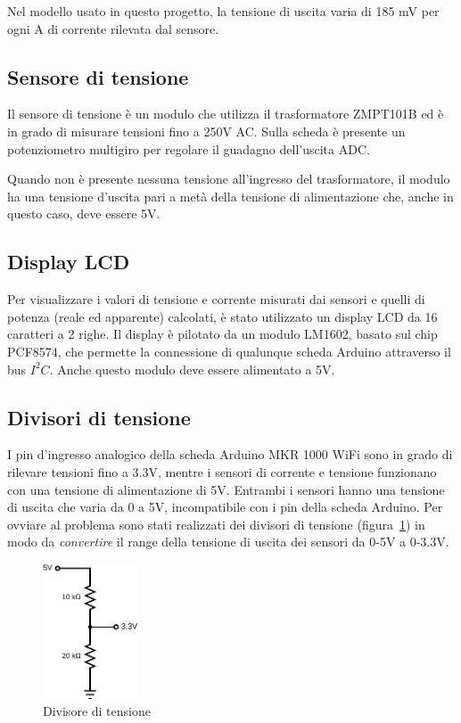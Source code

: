 \documentclass[italian,12pt,a4paper,oneside,final]{report}
\begin{document}
Nel modello usato in questo progetto, la tensione di uscita varia di 185 mV per ogni A di corrente rilevata dal sensore.

\subsection{Sensore di tensione}
Il sensore di tensione è un modulo che utilizza il trasformatore ZMPT101B ed è in grado di misurare tensioni fino a 250V AC.
Sulla scheda è presente un potenziometro multigiro per regolare il guadagno dell'uscita ADC.

Quando non è presente nessuna tensione all'ingresso del trasformatore, il modulo ha una tensione d'uscita pari a metà della tensione di alimentazione che, anche in questo caso, deve essere 5V.

\subsection{Display LCD}
Per visualizzare i valori di tensione e corrente misurati dai sensori e quelli di potenza (reale ed apparente) calcolati, è stato utilizzato un display LCD da 16 caratteri a 2 righe.
Il display è pilotato da un modulo LM1602, basato sul chip PCF8574, che permette la connessione di qualunque scheda Arduino attraverso il bus $I^2C$.
Anche questo modulo deve essere alimentato a 5V.

\newpage

\subsection{Divisori di tensione}
I pin d'ingresso analogico della scheda Arduino MKR 1000 WiFi sono in grado di rilevare tensioni fino a 3.3V, mentre i sensori di corrente e tensione funzionano con una tensione di alimentazione di 5V.
Entrambi i sensori hanno una tensione di uscita che varia da 0 a 5V, incompatibile con i pin della scheda Arduino.
Per ovviare al problema sono stati realizzati dei divisori di tensione (figura~\ref{fig:voltage_divider}) in modo da \textit{convertire} il range della tensione di uscita dei sensori da 0-5V a 0-3.3V.

\begin{figure}[h]
	\centering
	\includegraphics[width=0.25\textwidth]{voltage_divider.pdf}
	\caption{Divisore di tensione}
	\label{fig:voltage_divider}
\end{figure}
\end{document}

